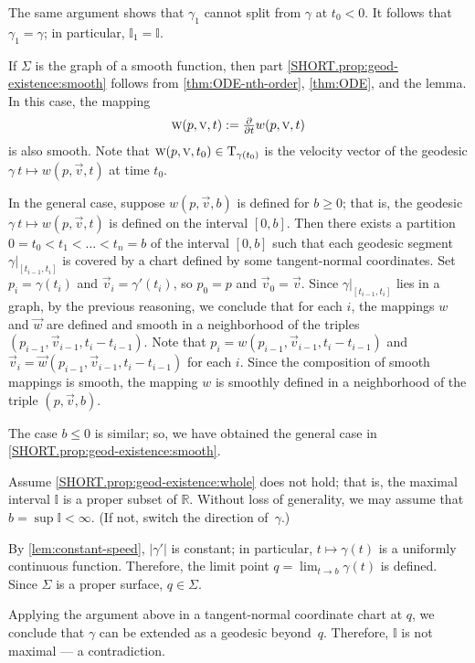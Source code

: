 The same argument shows that $\gamma_1$ cannot split from $\gamma$ at $t_0<0$.
It follows that $\gamma_1=\gamma$;
in particular, $\mathbb{I}_1=\mathbb{I}$.

If $\Sigma$ is the graph of a smooth function, then part \ref{SHORT.prop:geod-existence:smooth} follows from \ref{thm:ODE-nth-order}, \ref{thm:ODE}, and the lemma.
In this case, the mapping
\[\text{\sc{w}}(p,\text{\sc{v}},t)\mathrel{:=}\tfrac{\partial}{\partial t}w(p,\text{\sc{v}},t)\]
is also smooth.
Note that $\text{\sc{w}}(p,\text{\sc{v}},t_0) \in \mathrm{T}_{\gamma(t_0)}$ is the velocity vector of the geodesic $\gamma\:t\mapsto w(p,\vec v,t)$ at time $t_0$.

In the general case, suppose $w(p,{\vec v},b)$ is defined for $b\ge0$; that is, the geodesic $\gamma\:t\mapsto w(p,{\vec v},t)$ is defined on the interval $[0,b]$.
Then there exists a partition $0=t_0<t_1<\dots<t_n=b$ of the interval $[0,b]$ such that each geodesic segment $\gamma|_{[t_{i-1},t_i]}$ is covered by a chart defined by some tangent-normal coordinates.
Set $p_i=\gamma(t_i)$ and $\vec v_i=\gamma'(t_i)$, so $p_0=p$ and $\vec v_0=\vec v$.
Since $\gamma|_{[t_{i-1},t_i]}$ lies in a graph, by the previous reasoning, we conclude that for each $i$, the mappings
$w$ and $\vec w$ are defined and smooth in a neighborhood of the triples $(p_{i-1},\vec v_{i-1}, t_i-t_{i-1})$.
Note that $p_i=w(p_{i-1},\vec v_{i-1},t_i-t_{i-1})$ and $\vec v_i=\vec w(p_{i-1},\vec v_{i-1},t_i-t_{i-1})$ for each $i$.
Since the composition of smooth mappings is smooth, the mapping $w$ is smoothly defined in a neighborhood of the triple $(p,\vec v, b)$.

The case $b\le 0$ is similar; so, we have obtained the general case in \ref{SHORT.prop:geod-existence:smooth}.


Assume \ref{SHORT.prop:geod-existence:whole} does not hold;
that is, the maximal interval $\mathbb{I}$ is a proper subset of $\mathbb{R}$.
Without loss of generality, we may assume that $b=\sup\mathbb{I}<\infty$.
(If not, switch the direction of~$\gamma$.)

By \ref{lem:constant-speed}, $|\gamma'|$ is constant; in particular, $t\mapsto \gamma(t)$ is a uniformly continuous function.
Therefore, the limit point
$q=\lim_{t\to b}\gamma(t)$
is defined.
Since $\Sigma$ is a proper surface, $q\in \Sigma$. 

Applying the argument above in a tangent-normal coordinate chart at $q$, we conclude that $\gamma$ can be extended as a geodesic beyond~$q$.
Therefore, $\mathbb{I}$ is not maximal --- a contradiction.
\qeds

